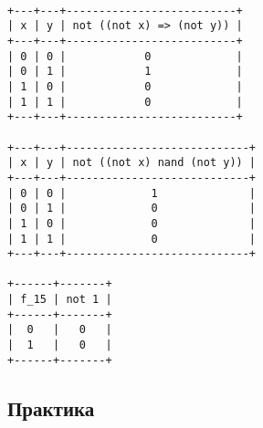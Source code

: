 \documentclass{article}
\begin{document}
\newpage

\begin{verbatim}

+---+---+--------------------------+
| x | y | not ((not x) => (not y)) |
+---+---+--------------------------+
| 0 | 0 |            0             |
| 0 | 1 |            1             |
| 1 | 0 |            0             |
| 1 | 1 |            0             |
+---+---+--------------------------+

+---+---+----------------------------+
| x | y | not ((not x) nand (not y)) |
+---+---+----------------------------+
| 0 | 0 |             1              |
| 0 | 1 |             0              |
| 1 | 0 |             0              |
| 1 | 1 |             0              |
+---+---+----------------------------+

+------+-------+
| f_15 | not 1 |
+------+-------+
|  0   |   0   |
|  1   |   0   |
+------+-------+

\end{verbatim}

\newpage

\begin{center}
	\subsection*{Практика}
\end{center}
\end{document}
